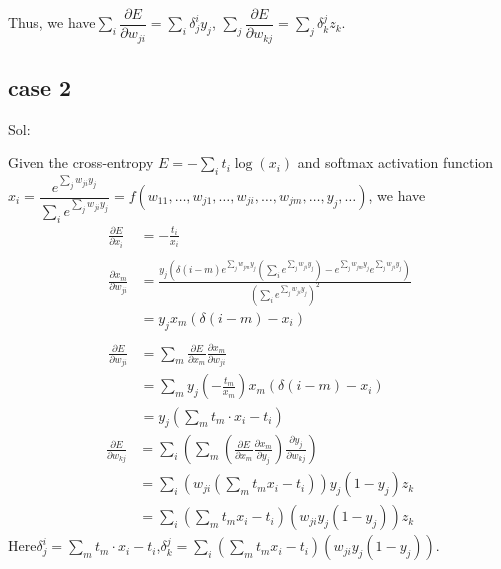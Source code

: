 \documentclass[a4paper,12pt]{article}
\begin{document}
Thus, we have\qquad $\sum_{i} \dfrac{\partial E}{\partial w_{ji}} = \sum_i \delta_j^i y_j$, \qquad $\sum_{j} \dfrac{\partial E}{\partial w_{kj}} = \sum_j \delta_k^j z_k$. 

\subsection{case 2}

Sol:

Given the cross-entropy $E = -\sum_i t_i \log(x_i)$ and softmax activation function $x_i = \dfrac{e^{\sum_{j} w_{ji} y_j}}{\sum_{i} e^{\sum_{j} w_{ji}y_j}} = f(w_{11}, \ldots , w_{j1}, \ldots, w_{ji}, \ldots,  w_{jm}, \ldots , y_j, \ldots)$, we have
\begin{align}
\frac{\partial E}{\partial x_i} &= - \frac{t_i}{x_i} \nonumber \\
\quad  \nonumber \\
\frac{\partial x_m}{\partial w_{ji}} & =  \frac{y_j(\delta(i-m) e^{\sum_{j}w_{jm}y_j}( \sum_{i}e^{\sum_{j}w_{ji}y_j} ) - e^{\sum_{j}w_{jm}y_j} e^{\sum_{j}w_{ji}y_j})}{(\sum_{i} e^{\sum_{j} w_{ji}y_j})^2}   \nonumber  \\
& = y_j x_m( \delta(i-m) - x_i)  \nonumber \\
\nonumber \\
\frac{\partial E}{\partial w_{ji}} & = \sum_{m} \frac{\partial E}{\partial x_m} \frac{\partial x_m}{\partial w_{ji}}   \nonumber \\
& = \sum_{m} y_j (-\frac{t_m}{x_m}) x_m( \delta(i - m) - x_i)  \nonumber \\
& = y_j (\sum_{m} t_m \cdot x_i - t_i) \nonumber 
\end{align}
\begin{align}
\frac{\partial E}{\partial w_{kj}} & = \sum_{i}( \sum_{m} (\frac{\partial E}{\partial x_m} \frac{\partial x_m}{\partial y_j}) \frac{\partial y_j}{\partial w_{kj}} ) \nonumber \\
& = \sum_{i} (w_{ji} (\sum_{m} t_m x_i - t_i)) y_j (1 - y_j) z_k \nonumber \\
& =  \sum_{i}(\sum_{m} t_m x_i - t_i)(w_{ji} y_j(1- y_j)) z_k \nonumber
\end{align}
Here\quad$\delta_j^i = \sum_{m} t_m \cdot x_i - t_i$,\quad$\delta_k^j =  \sum_{i}(\sum_{m} t_m x_i - t_i)(w_{ji} y_j(1- y_j))$. 
\end{document}
